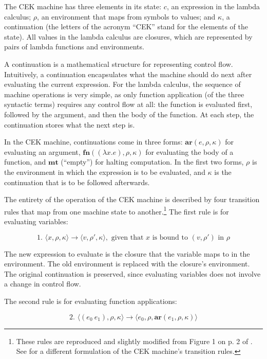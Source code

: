 \documentclass{article}
\begin{document}
The CEK machine has three elements in its state: $c$, an expression in the lambda calculus; $\rho$, an environment that maps from symbols to values; and $\kappa$, a continuation (the letters of the acronym ``CEK'' stand for the elements of the state). All values in the lambda calculus are closures, which are represented by pairs of lambda functions and environments.

A continuation is a mathematical structure for representing control flow. Intuitively, a continuation encapsulates what the machine should do next after evaluating the current expression. For the lambda calculus, the sequence of machine operations is very simple, as only function application (of the three syntactic terms) requires any control flow at all: the function is evaluated first, followed by the argument, and then the body of the function. At each step, the continuation stores what the next step is.

In the CEK machine, continuations come in three forms: $\textbf{ar}(e, \rho, \kappa)$ for evaluating an argument, $\textbf{fn}((\lambda x.e), \rho, \kappa)$ for evaluating the body of a function, and $\textbf{mt}$ (``empty'') for halting computation. In the first two forms, $\rho$ is the environment in which the expression is to be evaluated, and $\kappa$ is the continuation that is to be followed afterwards.

The entirety of the operation of the CEK machine is described by four transition rules that map from one machine state to another.\footnote{These rules are reproduced and slightly modified from Figure 1 on p. 2 of \cite{aam}. See \cite{cek} for a different formulation of the CEK machine's transition rules.} The first rule is for evaluating variables:

$$
\text{1. }
\langle x, \rho, \kappa \rangle
\to
\langle v, \rho', \kappa \rangle,
\text{ given that $x$ is bound to $(v, \rho')$ in $\rho$}
$$

The new expression to evaluate is the closure that the variable maps to in the environment. The old environment is replaced with the closure's environment. The original continuation is preserved, since evaluating variables does not involve a change in control flow.

The second rule is for evaluating function applications:

$$
\text{2. }
\langle (e_0\ e_1), \rho, \kappa \rangle
\to
\langle e_0, \rho, \textbf{ar}(e_1, \rho, \kappa) \rangle
$$
\end{document}
